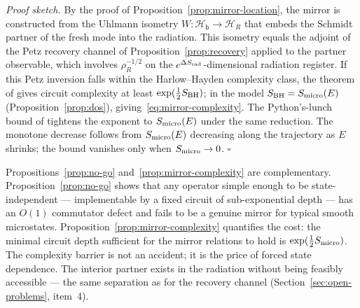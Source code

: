 \documentclass[12pt]{article}
\newcommand{\Smicro}{S_{\rm micro}}
\begin{document}
\emph{Proof sketch.}
By the proof of Proposition~\ref{prop:mirror-location}, the mirror is
constructed from the Uhlmann isometry $W:\mathcal H_{\mathsf b}\to
\mathcal H_R$ that embeds the Schmidt partner of the fresh mode into the
radiation.  This isometry equals the adjoint of the Petz recovery channel of
Proposition~\ref{prop:recovery} applied to the partner observable, which
involves $\rho_R^{-1/2}$ on the $e^{\Delta S_{\rm rad}}$-dimensional
radiation register.  If this Petz inversion falls within the Harlow--Hayden
complexity class, the theorem of \cite{HarlowHayden2013} gives circuit
complexity at least $\exp(\frac{1}{2}S_{\rm BH})$; in the model
$S_{\rm BH}=\Smicro(E)$ (Proposition~\ref{prop:dos}),
giving~\eqref{eq:mirror-complexity}.  The Python's-lunch bound of
\cite{BrownGharibyanPeningtonSusskind2020} tightens the exponent to
$\Smicro(E)$ under the same reduction.
The monotone decrease follows from $\Smicro(E)$ decreasing along the
trajectory as $E$ shrinks; the bound vanishes only when $\Smicro\to0$.
\hfill$\square$

\smallskip
Propositions~\ref{prop:no-go} and~\ref{prop:mirror-complexity} are
complementary.  Proposition~\ref{prop:no-go} shows that any operator
simple enough to be state-independent --- implementable by a fixed circuit
of sub-exponential depth --- has an $O(1)$ commutator defect and fails to
be a genuine mirror for typical smooth microstates.  Proposition~\ref{prop:mirror-complexity}
quantifies the cost: the minimal circuit depth sufficient for the mirror
relations to hold is $\exp(\frac{1}{2}\Smicro)$.  The complexity barrier is
not an accident; it is the price of forced state dependence.  The interior
partner exists in the radiation without being feasibly accessible ---
the same separation as for the recovery channel
(Section~\ref{sec:open-problems}, item~4).
\end{document}
